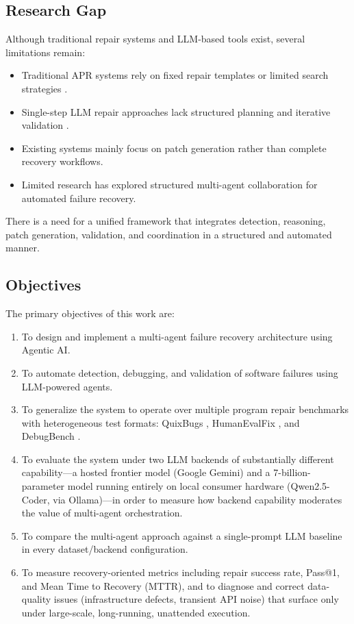 \documentclass[conference]{IEEEtran}
\begin{document}
\subsection{Research Gap}
Although traditional repair systems and LLM-based tools exist, several limitations remain:
\begin{itemize}
    \item Traditional APR systems rely on fixed repair templates or limited search strategies \cite{genprog, templateapr}.
    \item Single-step LLM repair approaches lack structured planning and iterative validation \cite{alpharepair}.
    \item Existing systems mainly focus on patch generation rather than complete recovery workflows.
    \item Limited research has explored structured multi-agent collaboration for automated failure recovery.
\end{itemize}

There is a need for a unified framework that integrates detection, reasoning, patch generation, validation, and coordination in a structured and automated manner.

\subsection{Objectives}
The primary objectives of this work are:
\begin{enumerate}
    \item To design and implement a multi-agent failure recovery architecture using Agentic AI.
    \item To automate detection, debugging, and validation of software failures using LLM-powered agents.
    \item To generalize the system to operate over multiple program repair benchmarks with heterogeneous test formats: QuixBugs \cite{quixbugs}, HumanEvalFix \cite{humanevalpack}, and DebugBench \cite{debugbench}.
    \item To evaluate the system under two LLM backends of substantially different capability---a hosted frontier model (Google Gemini) and a 7-billion-parameter model running entirely on local consumer hardware (Qwen2.5-Coder, via Ollama)---in order to measure how backend capability moderates the value of multi-agent orchestration.
    \item To compare the multi-agent approach against a single-prompt LLM baseline in every dataset/backend configuration.
    \item To measure recovery-oriented metrics including repair success rate, Pass@1, and Mean Time to Recovery (MTTR), and to diagnose and correct data-quality issues (infrastructure defects, transient API noise) that surface only under large-scale, long-running, unattended execution.
\end{enumerate}
\end{document}
